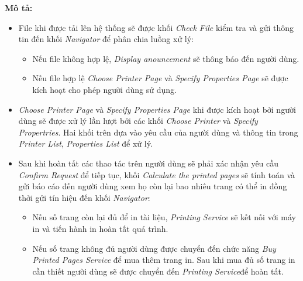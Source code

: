         \newpage
        \textbf{Mô tả:}
        \begin{itemize}
            \item File khi được tải lên hệ thống sẽ được khối \textit{Check File} kiểm tra và gửi thông tin đến khối \textit{Navigator} để phân chia luồng xử lý:
            \begin{itemize}
                \item Nếu file không hợp lệ, \textit{Display anouncement} sẽ thông báo đến người dùng.
                \item Nếu file hợp lệ \textit{Choose Printer Page} và \textit{Specify Properties Page} sẽ được kích hoạt cho phép người dùng sử dụng.
            \end{itemize}
            \item \textit{Choose Printer Page} và \textit{Specify Properties Page} khi được kích hoạt bởi người dùng sẽ được xử lý lần lượt bởi các khối \textit{Choose Printer} và \textit{Specify Propertries}. Hai khối trên dựa vào yêu cầu của người dùng và thông tin trong \textit{Printer List}, \textit{Properties List} để xử lý.
            \item Sau khi hoàn tất các thao tác trên người dùng sẽ phải xác nhận yêu cầu \textit{Confirm Request} để tiếp tục, khối \textit{Calculate the printed pages} sẽ tính toán và gửi báo cáo đến người dùng xem họ còn lại bao nhiêu trang có thể in đồng thởi gửi tín hiệu đến khối \textit{Navigator}:
            \begin{itemize}
                \item Nếu số trang còn lại đủ để in tài liệu, \textit{Printing Service} sẽ kết nối với máy in và tiến hành in hoàn tất quá trình.
                \item Nếu số trang không đủ người dùng được chuyển đến chức năng \textit{Buy Printed Pages Service} để mua thêm trang in. Sau khi mua đủ số trang in cần thiết người dùng sẽ được chuyển đến \textit{Printing Service}để hoàn tất.
            \end{itemize}
        \end{itemize}

        \newpage
